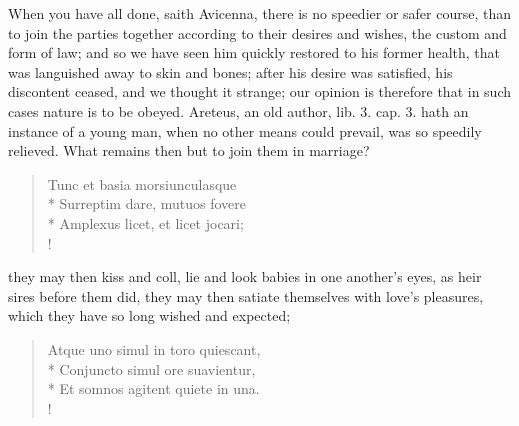 When you have all done, saith Avicenna, there is no speedier or
safer course, than to join the parties together according to their
desires and wishes, the custom and form of law; and so we have seen him
quickly restored to his former health, that was languished away to skin
and bones; after his desire was satisfied, his discontent ceased, and
we thought it strange; our opinion is therefore that in such cases
nature is to be obeyed. Areteus, an old author, lib. 3. cap. 3. hath an
instance of a young man, when no other means could prevail, was
so speedily relieved. What remains then but to join them in marriage?
%
\begin{latin}%
\begin{verse}%
Tunc et basia morsiunculasque\\*
Surreptim dare, mutuos fovere\\*
Amplexus licet, et licet jocari;\\!
\end{verse}%
\end{latin}%
%

they may then kiss and coll, lie and look babies in one another's eyes,
as heir sires before them did, they may then satiate themselves with
love's pleasures, which they have so long wished and expected;
%
\begin{latin}%
\begin{verse}%
Atque uno simul in toro quiescant,\\*
Conjuncto simul ore suavientur,\\*
Et somnos agitent quiete in una.\\!
\end{verse}%
\end{latin}%

